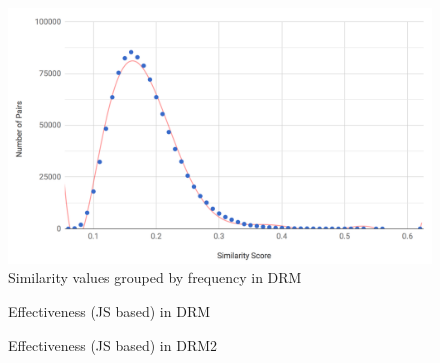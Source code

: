 \begin{figure}\centering
  \includegraphics[scale=0.50]{similaritiesDRM.png}
  \caption{Similarity values grouped by frequency in DRM}
  \label{fig:similaritiesDRM}
\end{figure}

\begin{figure}[!htb]\centering
   \begin{minipage}{0.49\textwidth}
     \caption{Effectiveness (JS based) in DRM}\label{fig:effectivenessDRMJS}
   \end{minipage}
   \begin {minipage}[c]{0.49\textwidth}
     \caption{Effectiveness (JS based) in DRM2}\label{fig:effectivenessDRM2JS}
   \end{minipage}
\end{figure}



